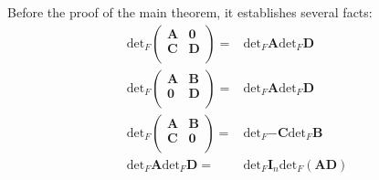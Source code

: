 \documentclass{article}
\numberwithin{equation}{subsection} %
\theoremstyle{definition}
\begin{document}
        Before the proof of the main theorem, it establishes several
        facts:
        \begin{align}
            \label{eq:sec1.1.1_fact_5}
            \text{det}_F  \left(
                \begin{array}{cc}
                \mathbf{A} & \mathbf{0} \\
                \mathbf{C} & \mathbf{D} \\
                \end{array}
                \right)
                =& \text{det}_F \mathbf{A} \text{det}_F \mathbf{D}
            \\
            \label{eq:sec1.1.1_fact_6}
            \text{det}_F  \left(
                \begin{array}{cc}
                \mathbf{A} & \mathbf{B} \\
                \mathbf{0} & \mathbf{D} \\
                \end{array}
                \right)
                =& \text{det}_F \mathbf{A} \text{det}_F \mathbf{D}
            \\
            \label{eq:sec1.1.1_fact_8}
            \text{det}_F  \left(
                \begin{array}{cc}
                \mathbf{A} & \mathbf{B} \\
                \mathbf{C} & \mathbf{0} \\
                \end{array}
                \right)
                =& \text{det}_F \mathbf{-C} \text{det}_F \mathbf{B}
            \\
            \label{eq:sec1.1.1_fact_88}
            \text{det}_F \mathbf{A} \text{det}_F \mathbf{D}
            =& \text{det}_F \mathbf{I}_n \text{det}_F (\mathbf{AD})
        \end{align}
\end{document}
